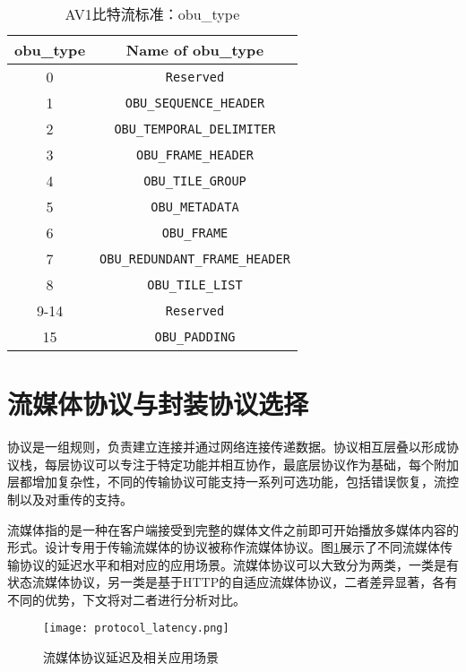 \begin{table}[!hpt]
    \renewcommand{\arraystretch}{0.8}
    \caption{AV1比特流标准：obu\_type}
    \label{tab:obutype}
    \centering
    \begin{tabular}{cc} \toprule
      obu\_type & Name of obu\_type\\ \midrule
      0    & \texttt{Reserved}  \\
      1    & \texttt{OBU\_SEQUENCE\_HEADER}     \\
      2    & \texttt{OBU\_TEMPORAL\_DELIMITER}   \\
      3    & \texttt{OBU\_FRAME\_HEADER}   \\
      4    & \texttt{OBU\_TILE\_GROUP}     \\
      5    & \texttt{OBU\_METADATA}     \\
      6    & \texttt{OBU\_FRAME}     \\
      7    & \texttt{OBU\_REDUNDANT\_FRAME\_HEADER}     \\
      8    & \texttt{OBU\_TILE\_LIST}     \\
      9-14 & \texttt{Reserved}     \\
      15   & \texttt{OBU\_PADDING}     \\ \bottomrule
    \end{tabular}
  \end{table}


\section{流媒体协议与封装协议选择}

协议是一组规则，负责建立连接并通过网络连接传递数据。协议相互层叠以形成协议栈，每层协议可以专注于特定功能并相互协作，最底层协议作为基础，每个附加层都增加复杂性，不同的传输协议可能支持一系列可选功能，包括错误恢复，流控制以及对重传的支持。

流媒体指的是一种在客户端接受到完整的媒体文件之前即可开始播放多媒体内容的形式。设计专用于传输流媒体的协议被称作流媒体协议。图\ref{fig:protocol-latency}展示了不同流媒体传输协议的延迟水平和相对应的应用场景。流媒体协议可以大致分为两类，一类是有状态流媒体协议，另一类是基于HTTP的自适应流媒体协议，二者差异显著，各有不同的优势，下文将对二者进行分析对比。

\begin{figure}[!htp]
	\centering
	\texttt{[image: protocol\_latency.png]}
	\caption{流媒体协议延迟及相关应用场景\cite{2019VideoStreaming2019}}
	\label{fig:protocol-latency}
\end{figure}

